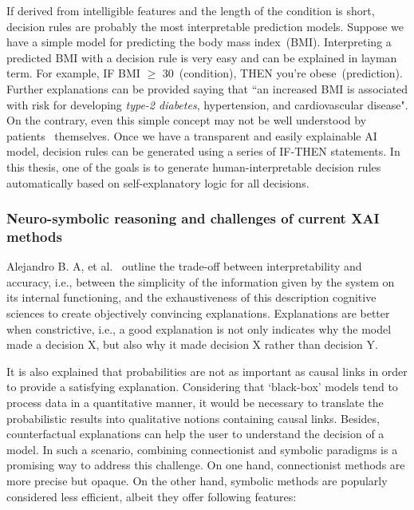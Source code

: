 \hspace*{3.5mm} If derived from intelligible features and the length of the condition is short, decision rules are probably the most interpretable prediction models. Suppose we have a simple model for predicting the body mass index~(BMI). Interpreting a predicted BMI with a decision rule is very easy and can be explained in layman term. For example, IF BMI $\geq$ 30~(condition), THEN you're obese~(prediction). Further explanations can be provided saying that ``an increased BMI is associated with risk for developing \textit{type-2 diabetes}, hypertension, and cardiovascular disease". 
On the contrary, even this simple concept may not be well understood by patients~\cite{post2015patient} themselves. Once we have a transparent and easily explainable AI model, decision rules can be generated using a series of IF-THEN statements. In this thesis, one of the goals is to generate human-interpretable decision rules automatically based on self-explanatory logic for all decisions. 

\subsubsection{Neuro-symbolic reasoning and challenges of current XAI methods}
Alejandro B. A, et al.~\cite{arrieta2020explainable} outline the trade-off between interpretability and accuracy, i.e., between the simplicity of the information given by the system on its internal functioning, and the exhaustiveness of this description
cognitive sciences to create objectively convincing explanations.
Explanations are better when constrictive, i.e., a good explanation is not only indicates why the model made a decision $\mathrm{X}$, but also why it made decision $\mathrm{X}$ rather than decision $\mathrm{Y}$. 

\hspace*{3.5mm}It is also explained that probabilities are not as important as causal links in order to provide a satisfying explanation. Considering that `black-box' models tend to process data in a quantitative manner, it would be necessary to translate the probabilistic results into qualitative notions containing causal links. Besides, counterfactual explanations can help the user to understand the decision of a model. In such a scenario, combining connectionist and symbolic paradigms is a promising way to address this challenge. On one hand, connectionist methods are more precise but opaque. On the other hand, symbolic methods are popularly considered less efficient, albeit they offer following features:

